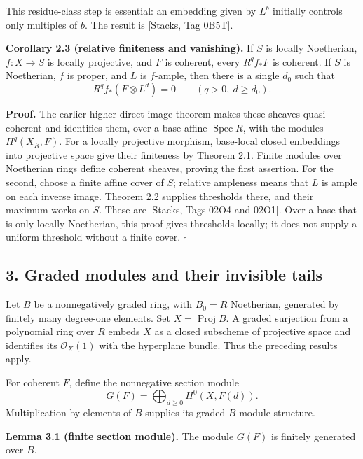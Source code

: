\documentclass[11pt]{article}
\begin{document}
This residue-class step is essential: an embedding given by \(L^b\)
initially controls only multiples of \(b\). The result is {[}Stacks, Tag
0B5T{]}.

\textbf{Corollary 2.3 (relative finiteness and vanishing).} If \(S\) is
locally Noetherian, \(f:X\to S\) is locally projective, and \(F\) is
coherent, every \(R^qf_*F\) is coherent. If \(S\) is Noetherian, \(f\)
is proper, and \(L\) is \(f\)-ample, then there is a single \(d_0\) such
that \[
R^qf_*(F\otimes L^d)=0\qquad(q>0,\ d\ge d_0).
\]

\textbf{Proof.} The earlier higher-direct-image theorem makes these
sheaves quasi-coherent and identifies them, over a base affine
\(\operatorname{Spec}R\), with the modules \(H^q(X_R,F)\). For a locally
projective morphism, base-local closed embeddings into projective space
give their finiteness by Theorem 2.1. Finite modules over Noetherian
rings define coherent sheaves, proving the first assertion. For the
second, choose a finite affine cover of \(S\); relative ampleness means
that \(L\) is ample on each inverse image. Theorem 2.2 supplies
thresholds there, and their maximum works on \(S\). These are {[}Stacks,
Tags 02O4 and 02O1{]}. Over a base that is only locally Noetherian, this
proof gives thresholds locally; it does not supply a uniform threshold
without a finite cover. \(\square\)

\subsection{3. Graded modules and their invisible
tails}\label{graded-modules-and-their-invisible-tails}

Let \(B\) be a nonnegatively graded ring, with \(B_0=R\) Noetherian,
generated by finitely many degree-one elements. Set
\(X=\operatorname{Proj}B\). A graded surjection from a polynomial ring
over \(R\) embeds \(X\) as a closed subscheme of projective space and
identifies its \(\mathcal O_X(1)\) with the hyperplane bundle. Thus the
preceding results apply.

For coherent \(F\), define the nonnegative section module \[
G(F)=\bigoplus_{d\ge0}H^0(X,F(d)).
\] Multiplication by elements of \(B\) supplies its graded \(B\)-module
structure.

\textbf{Lemma 3.1 (finite section module).} The module \(G(F)\) is
finitely generated over \(B\).
\end{document}
